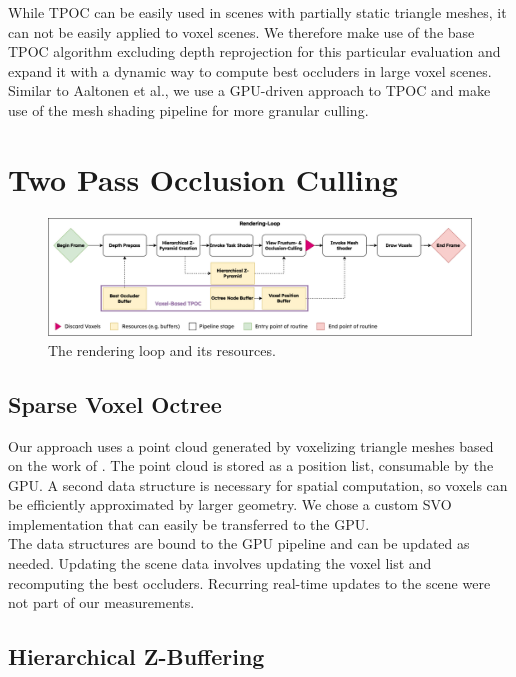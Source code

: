 \documentclass[conference]{IEEEtran}
\begin{document}
\noindent
While \ac{TPOC} can be easily used in scenes with partially static triangle meshes, it can not be 
easily applied to voxel scenes. We therefore make use of the base \ac{TPOC} algorithm excluding depth 
reprojection for this particular evaluation and expand it with a dynamic way to compute best occluders 
in large voxel scenes. Similar to Aaltonen et al., we use a \ac{GPU}-driven approach to \ac{TPOC} and 
make use of the mesh shading pipeline for more granular culling.


\section{Two Pass Occlusion Culling} \label{sec-hierarchical-z-buffering}

\begin{figure}
    \includegraphics[width=\linewidth]{images/pipeline-rendering-loop.png}
    \caption{The rendering loop and its resources.}
    \label{fig:rendering-loop}
\end{figure}

\subsection{Sparse Voxel Octree}

\noindent
Our approach uses a point cloud generated by voxelizing triangle meshes based on the work of \cite{b5}. 
The point cloud is stored as a position list, consumable by the \ac{GPU}. A second data structure is 
necessary for spatial computation, so voxels can be efficiently approximated by larger geometry. 
We chose a custom \ac{SVO} implementation that can easily be transferred to the \ac{GPU}. \\

\noindent
The data structures are bound to the \ac{GPU} pipeline and can be updated as needed. Updating the scene data 
involves updating the voxel list and recomputing the best occluders. Recurring real-time updates to the 
scene were not part of our measurements.

\subsection{Hierarchical Z-Buffering}
\end{document}
